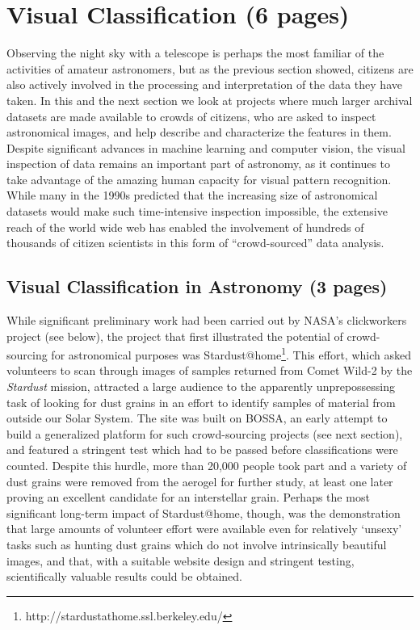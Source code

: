 \documentclass{ar2e}
\begin{document}

\section{Visual Classification (6 pages)}
\label{sec:class}

Observing the night sky with a telescope is perhaps the most familiar of the
activities of amateur astronomers, but as the previous section showed, citizens
are also actively involved in the processing and interpretation of the data they
have taken.  In this and the next section we look at projects where much larger
archival datasets are made available to crowds of citizens, who are asked to
inspect astronomical images, and help describe and characterize the features in
them. Despite significant advances in machine learning and computer vision, the
visual inspection of data remains an important part of astronomy, as it
continues to take advantage of the amazing human capacity for visual pattern
recognition. While many in the 1990s predicted that the increasing size of
astronomical datasets would make such time-intensive inspection impossible, the
extensive reach of the world wide web has enabled the involvement of hundreds of
thousands of citizen scientists in this form of ``crowd-sourced'' data
analysis. 


\subsection{Visual Classification in Astronomy (3 pages)}
\label{sec:class:astro}

While significant preliminary work had been carried out by NASA's clickworkers
project (see below), the project that first illustrated the potential of
crowd-sourcing for astronomical purposes was Stardust@home\footnote{http://stardustathome.ssl.berkeley.edu/}. This effort, which
asked volunteers to scan through images of samples returned from Comet Wild-2
by the \emph{Stardust} mission, attracted a large audience to the apparently
unprepossessing task of looking for dust grains in an effort to identify
samples of material from outside our Solar System. The site was built on
BOSSA, an early attempt to build a generalized platform for such crowd-sourcing
projects (see next section), and featured a stringent test which had to be
passed before classifications were counted. Despite this hurdle, more than
20,000 people took part and a variety of dust grains were removed from the
aerogel for further study, at least one later proving an excellent candidate
for an interstellar grain. Perhaps the most significant long-term impact of
Stardust@home, though, was the demonstration that large amounts of volunteer
effort were available even for relatively `unsexy' tasks such as hunting dust
grains which do not involve intrinsically beautiful images, and that, with a
suitable website design and stringent testing, scientifically valuable results
could be obtained. 
\end{document}
